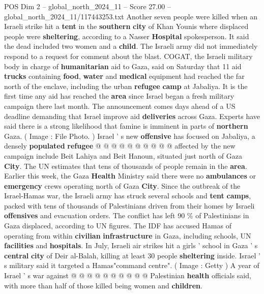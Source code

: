 \begin{textsample}{POS Dim 2 – global\_north\_2024\_11 – Score 27.00 – global\_north\_2024\_11/117443253.txt}  \label{ex:f2_pos_357}
Another seven people were killed when an Israeli strike hit a \textbf{tent} in the \textbf{southern} \textbf{city} of Khan Younis where displaced people were \textbf{sheltering}, according to a Nasser \textbf{Hospital} spokesperson.
It said the dead included two women and a \textbf{child}.
The Israeli army did not immediately respond to a request for comment about the blast.
COGAT, the Israeli military body in charge of \textbf{humanitarian} aid to Gaza, said on Saturday that 11 aid \textbf{trucks} containing \textbf{food}, \textbf{water} and \textbf{medical} equipment had reached the far north of the enclave, including the urban \textbf{refugee} \textbf{camp} at Jabaliya.
It is the first time any aid has reached the \textbf{area} since Israel began a fresh military campaign there last month.
The announcement comes days ahead of a US deadline demanding that Israel improve aid \textbf{deliveries} across Gaza.
Experts have said there is a strong likelihood that famine is imminent in parts of \textbf{northern} Gaza. ( Image : File Photo. ) Israel ' s new \textbf{offensive} has focused on Jabaliya, a densely \textbf{populated} \textbf{refugee} @ @ @ @ @ @ @ @ @ @ affected by the new campaign include Beit Lahiya and Beit Hanoun, situated just north of Gaza \textbf{City}.
The UN estimates that tens of thousands of people remain in the \textbf{area}.
Earlier this week, the Gaza \textbf{Health} Ministry said there were no \textbf{ambulances} or \textbf{emergency} crews operating north of Gaza \textbf{City}.
Since the outbreak of the Israel-Hamas war, the Israeli army has struck several schools and \textbf{tent} \textbf{camps}, packed with tens of thousands of Palestinians driven from their homes by Israeli \textbf{offensives} and evacuation orders.
The conflict has left 90 \% of Palestinians in Gaza displaced, according to UN figures.
The IDF has accused Hamas of operating from within \textbf{civilian} \textbf{infrastructure} in Gaza, including schools, UN \textbf{facilities} and \textbf{hospitals}.
In July, Israeli air strikes hit a girls ' school in Gaza ' s \textbf{central} \textbf{city} of Deir al-Balah, killing at least 30 people \textbf{sheltering} inside.
Israel ' s military said it targeted a Hamas"command centre". ( Image : Getty ) A year of Israel ' s war against @ @ @ @ @ @ @ @ @ @ Palestinian \textbf{health} officials said, with more than half of those killed being women and \textbf{children}.

\end{textsample}
